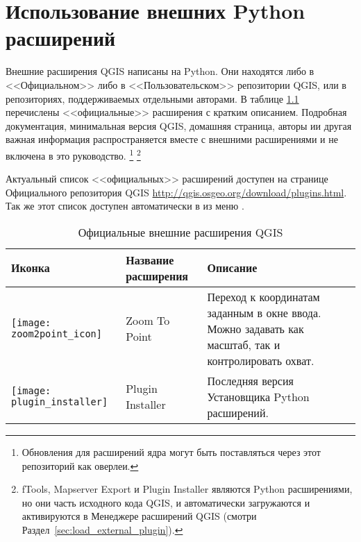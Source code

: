 
\chapter{Использование внешних Python расширений}\label{sec:external_plugins}


Внешние расширения QGIS написаны на Python. Они находятся либо в <<Официальном>>
либо в <<Пользовательском>> репозитории QGIS, или в репозиториях, поддерживаемых
отдельными авторами.
В таблице \ref{tab:external_plugins} перечислены <<официальные>> расширения с
кратким описанием.
Подробная документация, минимальная версия QGIS, домашняя страница, авторы
ии другая важная информация распространяется вместе с внешними расширениями
и не включена в это руководство.
\footnote{Обновления для расширений ядра могут быть поставляться через этот
репозиторий как оверлеи.}
\footnote{fTools, Mapserver Export и Plugin Installer являются Python расширениями,
но они часть исходного кода QGIS, и автоматически загружаются и
активируются в Менеджере расширений QGIS (смотри Раздел~\ref{sec:load_external_plugin}).}

Актуальный список <<официальных>> расширений доступен на странице Официального
репозитория QGIS \url{http://qgis.osgeo.org/download/plugins.html}. Так же
этот список доступен автоматически в 
из меню .

\begin{table}[H]
\centering
 \begin{tabular}{|l|l|p{8cm}|}
\hline \textbf{Иконка} & \textbf{Название расширения} & \textbf{Описание}\\
\hline
\texttt{[image: zoom2point\_icon]}
 & Zoom To Point \index{plugins!Zoom To Point} & Переход к координатам
  заданным в окне ввода. Можно задавать как масштаб, так и
  контролировать охват.\\
\hline
\texttt{[image: plugin\_installer]}
 & Plugin Installer \index{plugins!Plugin Installer} & Последняя версия Установщика Python расширений.\\
\hline
\end{tabular}
\caption{Официальные внешние расширения QGIS}\label{tab:external_plugins}
\end{table}

